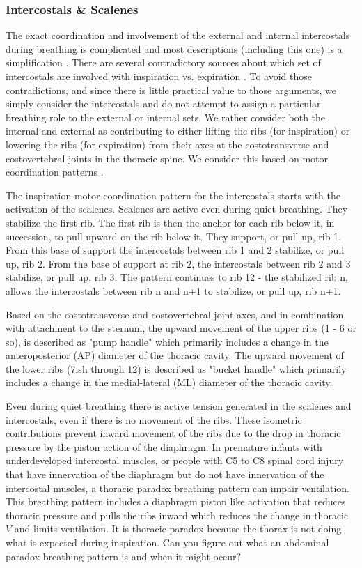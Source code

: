 \subsubsection{Intercostals \& Scalenes}

The exact coordination and involvement of the external and internal intercostals during breathing is complicated and most descriptions (including this one) is a simplification \cite{lumb_nunns_2020, de_troyer_respiratory_2005}. There are several contradictory sources about which set of intercostals are involved with inspiration vs. expiration \cite{lumb_nunns_2020, hall_guyton_2020}. To avoid those contradictions, and since there is little practical value to those arguments, we simply consider the intercostals and do not attempt to assign a particular breathing role to the external or internal sets. We rather consider both the internal and external as contributing to either lifting the ribs (for inspiration) or lowering the ribs (for expiration) from their axes at the costotransverse and costovertebral joints in the thoracic spine. We consider this based on motor coordination patterns \cite{gilbert_recognizing_2014}.

The inspiration motor coordination pattern for the intercostals starts with the activation of the scalenes. Scalenes are active even during quiet breathing. They stabilize the first rib. The first rib is then the anchor for each rib below it, in succession, to pull upward on the rib below it. They support, or pull up, rib 1. From this base of support the intercostals between rib 1 and 2 stabilize, or pull up, rib 2. From the base of support at rib 2, the intercostals between rib 2 and 3 stabilize, or pull up, rib 3. The pattern continues to rib 12 - the stabilized rib n, allows the intercostals between rib n and n+1 to stabilize, or pull up, rib n+1.

Based on the costotransverse and costovertebral joint axes, and in combination with attachment to the sternum, the upward movement of the upper ribs (1 - 6 or so), is described as "pump handle" which primarily includes a change in the anteroposterior (AP) diameter of the thoracic cavity. The upward movement of the lower ribs (7ish through 12) is described as "bucket handle" which primarily includes a change in the medial-lateral (ML) diameter of the thoracic cavity.

Even during quiet breathing there is active tension generated in the scalenes and intercostals, even if there is no movement of the ribs. These isometric contributions prevent inward movement of the ribs due to the drop in thoracic pressure by the piston action of the diaphragm. In premature infants with underdeveloped intercostal muscles, or people with C5 to C8 spinal cord injury that have innervation of the diaphragm but do not have innervation of the intercostal muscles, a thoracic paradox breathing pattern can impair ventilation. This breathing pattern includes a diaphragm piston like activation that reduces thoracic pressure and pulls the ribs inward which reduces the change in thoracic $V$ and limits ventilation. It is thoracic paradox because the thorax is not doing what is expected during inspiration. Can you figure out what an abdominal paradox breathing pattern is and when it might occur?

